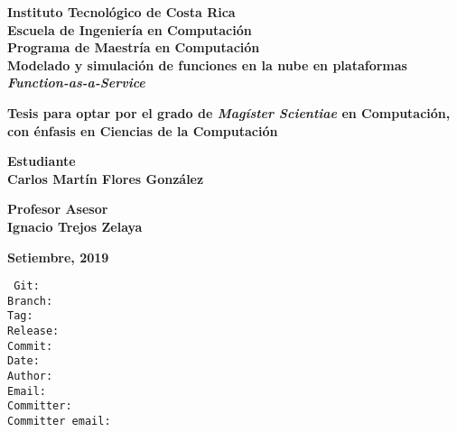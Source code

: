 \documentclass[12pt, twoside]{report}
\begin{document}
\thispagestyle{plain}
\begin{titlepage}
	\begin{center}
        {\fontsize{24}{28}\selectfont \textbf{Instituto Tecnológico de Costa Rica}\\}
        \vspace{1cm}
        {\fontsize{20}{24}\selectfont \textbf{Escuela de Ingeniería en Computación}\\}
        {\fontsize{18}{22}\selectfont \textbf{Programa de Maestría en Computación}\\}
        \vspace{2cm}
        {\fontsize{20}{24}\selectfont \textbf{Modelado y simulación de funciones en la nube en plataformas \textit{Function-as-a-Service}}}    
    
    
        \vspace{2cm}
        {\fontsize{14}{17}\selectfont \textbf{Tesis para optar por el grado de \emph{Magíster Scientiae} en Computación, con énfasis en Ciencias de la Computación
}}
        
       \vspace{1.5cm}
       {\fontsize{14}{17}\selectfont \textbf{Estudiante\\ Carlos Martín Flores González}} 
       
       \vspace{1cm}
       {\fontsize{14}{17}\selectfont \textbf{Profesor Asesor\\ Ignacio Trejos Zelaya}}
       
       \vspace{1.5cm}
       {\fontsize{14}{17}\selectfont \textbf{Setiembre, 2019}}                       
        
    \end{center}
\end{titlepage}

{} 
\renewcommand*\contentsname{Índice}

\renewcommand{\listtablename}{Lista de Tablas}


\newpage
{\footnotesize
\noindent
\texttt{
Git: \gitReferences \\
Branch: \gitBranch \\
Tag: \gitVtag \\
Release: \gitReln{} \\
Commit: \gitAbbrevHash \\
Date: \gitAuthorIsoDate \\
Author: \gitAuthorName\\
Email: \gitAuthorEmail\\
Committer: \gitCommitterName\\
Committer email: \gitCommitterEmail
}}
\newpage




\end{document}
